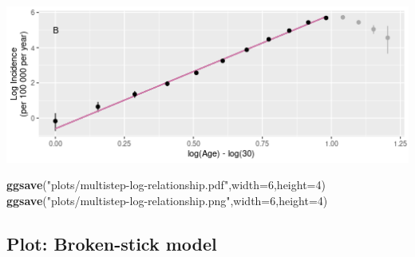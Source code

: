 \documentclass[
]{article}
\newenvironment{Shaded}{\begin{snugshade}}{\end{snugshade}}
\newcommand{\DataTypeTok}[1]{\textcolor[rgb]{0.13,0.29,0.53}{#1}}
\newcommand{\DecValTok}[1]{\textcolor[rgb]{0.00,0.00,0.81}{#1}}
\newcommand{\KeywordTok}[1]{\textcolor[rgb]{0.13,0.29,0.53}{\textbf{#1}}}
\newcommand{\NormalTok}[1]{#1}
\newcommand{\StringTok}[1]{\textcolor[rgb]{0.31,0.60,0.02}{#1}}
\begin{document}
\includegraphics{multistep-model-comparison_files/figure-latex/linear-figure-1.png}

\begin{Shaded}
\begin{Highlighting}[]
\KeywordTok{ggsave}\NormalTok{(}\StringTok{"plots/multistep-log-relationship.pdf"}\NormalTok{,}\DataTypeTok{width=}\DecValTok{6}\NormalTok{,}\DataTypeTok{height=}\DecValTok{4}\NormalTok{)}
\KeywordTok{ggsave}\NormalTok{(}\StringTok{"plots/multistep-log-relationship.png"}\NormalTok{,}\DataTypeTok{width=}\DecValTok{6}\NormalTok{,}\DataTypeTok{height=}\DecValTok{4}\NormalTok{)}
\end{Highlighting}
\end{Shaded}

\hypertarget{plot-broken-stick-model}{%
\subsection{Plot: Broken-stick model}\label{plot-broken-stick-model}}
\end{document}
